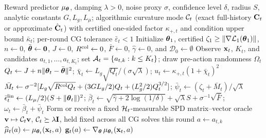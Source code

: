 \begin{algorithm}[H]
\caption{Operational CC-UCB with path certificates}\label{alg:ccucb-detailed}
\begin{algorithmic}[1]
\REQUIRE Reward predictor $\mu_{\boldsymbol{\theta}}$, damping $\lambda>0$,
         noise proxy $\sigma$, confidence level $\delta$, radius $S$,
         analytic constants $G,L_g,L_\mu$;
         algorithmic curvature mode $\mathcal{C}_t$ (exact full-history $\mathbf{C}_t$
         or approximate $\hat{\mathbf{C}}_t$) with certified one-sided factor
         $\kappa_{+,t}$ and condition upper bound $\bar\kappa_t$;
         per-round CG tolerance $\bar\varepsilon_t<1$
\STATE Initialize $\boldsymbol{\theta}_1$, certified $\zeta_1\ge\|\nabla\mathcal{L}_1(\boldsymbol{\theta}_1)\|$,
       $n\gets0$, $\bar{\boldsymbol{\theta}}\gets\mathbf0$, $J\gets0$,
       $R^{\rm col}\gets0$, $\bar F\gets0$, $\hat\gamma\gets0$, and
       $\mathcal D_0\gets\emptyset$
  \STATE Observe $\mathbf{x}_t$, $K_t$, and candidates
         $a_{t,1},\ldots,a_{t,K_t}$; set
         $\mathcal{A}_t=\{a_{t,k}:k\le K_t\}$; draw pre-action randomness $\Omega_t$
         \hfill{}
  \STATE $Q_t\gets J+n\|\boldsymbol{\theta}_t-\bar{\boldsymbol{\theta}}\|^2$;
         $\bar\chi_t\gets L_g\sqrt{Q_t}/(\sigma\sqrt\lambda)$;
         $u_t\gets\kappa_{+,t}(1+\bar\chi_t)^2$
  \STATE $\bar M_t\gets\sigma^{-2}[L_g\sqrt{R^{\rm col}Q_t}
         +(3GL_g/2)Q_t+(L_g^2/2)Q_t^{3/2}]$;
         $\bar\psi_t\gets(\zeta_t+\bar M_t)/\sqrt\lambda$
         \hfill{}
  \STATE $\bar\epsilon_t^{\rm lin}\gets(L_\mu/2)(S+\|\boldsymbol{\theta}_t\|)^2$;
         $\bar\beta_t\gets\sqrt{\hat\gamma+2\log(1/\delta)}
         +\sqrt\lambda S+\sigma^{-1}\sqrt{\bar F}$;
         $\omega_t\gets\bar\beta_t+\bar\psi_t$
         \hfill{}
  \STATE Form or receive a fixed $\mathcal{H}_t$-measurable SPD matrix--vector
         oracle $\mathbf{v}\mapsto\mathcal{C}_t\mathbf{v}$, $\mathcal{C}_t\succeq\lambda\mathbf{I}$, held fixed
         across all CG solves this round \label{line:oracle-detailed}
         \hfill{}
    \STATE $a\gets a_{t,k}$
    \STATE $\widehat\mu_t(a) \gets \mu_{\boldsymbol{\theta}_t}(\mathbf{x}_t, a)$
        \hfill{}
    \STATE $\mathbf{g}_t(a) \gets \nabla_{\boldsymbol{\theta}}\,\mu_{\boldsymbol{\theta}_t}(\mathbf{x}_t, a)$
        \hfill{}

\end{algorithmic}
\end{algorithm}
